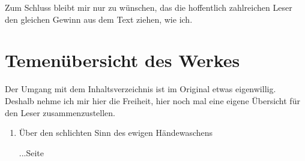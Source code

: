 Zum Schluss bleibt mir nur zu wünschen, das die hoffentlich zahlreichen Leser
den gleichen Gewinn aus dem Text ziehen, wie ich.

\chapter{Temenübersicht des Werkes}

Der Umgang mit dem Inhaltsverzeichnis ist im Original etwas eigenwillig. Deshalb
nehme ich mir hier die Freiheit, hier noch mal eine eigene Übersicht für den
Leser zusammenzustellen.

\begin{enumerate}
 \item Über den schlichten Sinn des ewigen Händewaschens \begin{flushright}
...Seite \pageref{kap10_ende}\end{flushright}
\end{enumerate}

